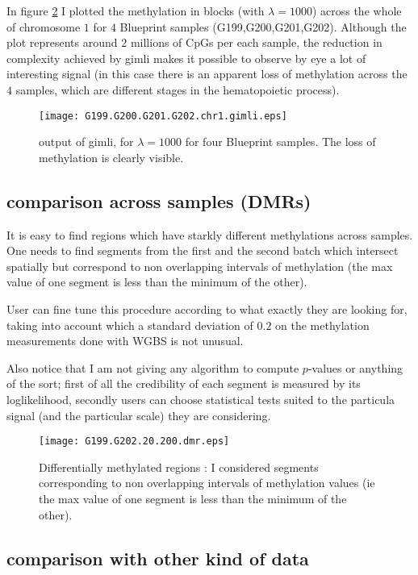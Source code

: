 \documentclass[11pt]{amsart}
\begin{document}
In figure \ref{ex1} I plotted the methylation in blocks (with $\lambda=1000$) 
across the whole of chromosome $1$ for $4$ Blueprint samples
(G199,G200,G201,G202). Although the plot represents around $2$ millions of 
CpGs per each sample, the reduction in complexity achieved by gimli makes it 
possible to observe by eye a lot of interesting signal (in this case there is 
an apparent loss of methylation across the $4$ samples, which are different 
stages in the hematopoietic process).

\begin{figure}\label{ex1}
\texttt{[image: G199.G200.G201.G202.chr1.gimli.eps]}
\caption{output of gimli, for $\lambda=1000$ for four Blueprint samples. The loss of
methylation is clearly visible.}
\end{figure}


\subsection{comparison across samples (DMRs)}

It is easy to find regions which have starkly different 
methylations across samples. One needs to find segments 
from the first and the second batch which intersect spatially
but correspond to non overlapping intervals of methylation 
(the max value of one 
segment is less than the minimum of the other).

User can fine tune this procedure according to what exactly they 
are looking for, taking into account which a standard deviation of $0.2$
on the methylation measurements done with WGBS is not unusual.

Also notice that I am not giving any algorithm to compute $p$-values
or anything of the sort; first of all the credibility of each segment
is measured by its loglikelihood, secondly users can choose statistical
tests suited to the particula signal (and the particular scale)
they are considering.

\begin{figure}\label{ex1}
\texttt{[image: G199.G202.20.200.dmr.eps]}
\caption{Differentially methylated regions : I considered segments corresponding to
non overlapping intervals of methylation values (ie the max value of one 
segment is less than the minimum of the other).}
\end{figure}

\subsection{comparison with other kind of data}
\end{document}
